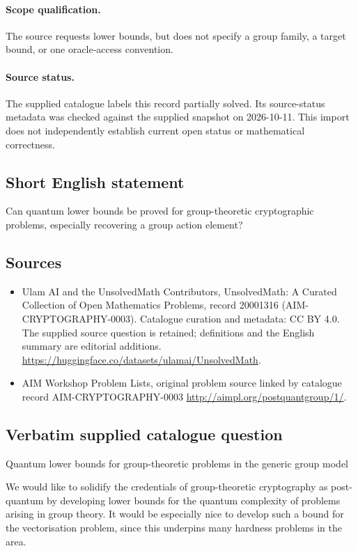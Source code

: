 \documentclass[11pt]{article}
\begin{document}
\paragraph{Scope qualification.}
The source requests lower bounds, but does not specify a group family, a target bound, or one oracle-access convention.
\paragraph{Source status.}
The supplied catalogue labels this record partially solved. Its source-status metadata was checked against the supplied snapshot on 2026-10-11. This import does not independently establish current open status or mathematical correctness.
\subsection{Short English statement}
Can quantum lower bounds be proved for group-theoretic cryptographic problems, especially recovering a group action element?
\subsection{Sources}
\begin{itemize}
\item[S1] Ulam AI and the UnsolvedMath Contributors, UnsolvedMath: A Curated Collection of Open Mathematics Problems, record 20001316 (AIM-CRYPTOGRAPHY-0003). Catalogue curation and metadata: CC BY 4.0. The supplied source question is retained; definitions and the English summary are editorial additions.
\url{https://huggingface.co/datasets/ulamai/UnsolvedMath}.
\item[S2] AIM Workshop Problem Lists, original problem source linked by catalogue record AIM-CRYPTOGRAPHY-0003
\url{http://aimpl.org/postquantgroup/1/}.
\end{itemize}
\subsection{Verbatim supplied catalogue question}
Quantum lower bounds for group-theoretic problems in the generic group model

We would like to solidify the credentials of group-theoretic cryptography as post-quantum by developing lower bounds for the quantum complexity of problems arising in group theory. It would be especially nice to develop such a bound for the vectorisation problem, since this underpins many hardness problems in the area.
\end{document}
